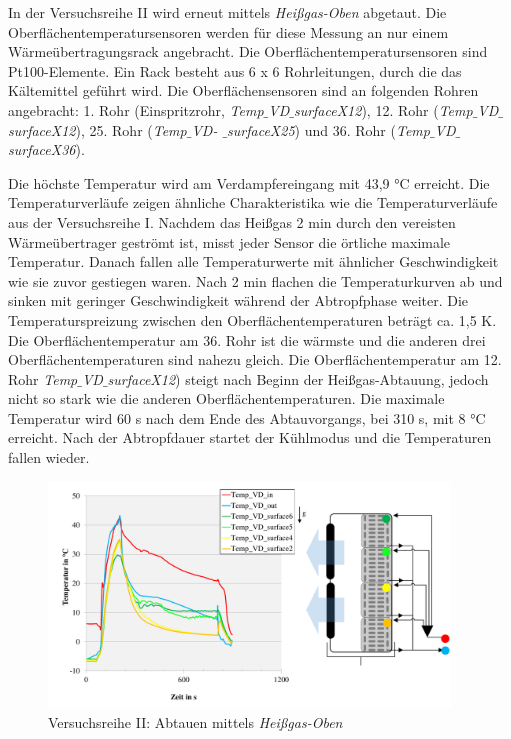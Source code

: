 In der Versuchsreihe II wird erneut mittels \textit{Heißgas-Oben} abgetaut. Die Oberflächentemperatursensoren werden für diese Messung an nur einem Wärmeübertragungsrack angebracht. Die Oberflächentemperatursensoren sind Pt100-Elemente. Ein Rack besteht aus 6 x 6 Rohrleitungen, durch die das Kältemittel geführt wird. Die Oberflächensensoren sind an folgenden Rohren angebracht: 1. Rohr (Einspritzrohr, \textit{Temp$\_$VD$\_$surfaceX12}), 12. Rohr (\textit{Temp$\_$VD$\_$surfaceX12}), 25. Rohr (\textit{Temp$\_$VD- $\_$surfaceX25}) und 36.  Rohr (\textit{Temp$\_$VD$\_$surfaceX36}).

Die höchste Temperatur wird am Verdampfereingang mit 43,9 °C erreicht. Die Temperaturverläufe zeigen ähnliche Charakteristika wie die Temperaturverläufe aus der Versuchsreihe I. Nachdem das Heißgas 2 min durch den vereisten Wärmeübertrager geströmt ist, misst jeder Sensor die örtliche maximale Temperatur.  Danach fallen alle Temperaturwerte mit ähnlicher Geschwindigkeit wie sie zuvor gestiegen waren. Nach 2 min flachen die Temperaturkurven ab und sinken mit geringer Geschwindigkeit während der Abtropfphase weiter. Die Temperaturspreizung zwischen den Oberflächentemperaturen beträgt ca. 1,5 K. Die Oberflächentemperatur am 36. Rohr ist die wärmste und die anderen drei Oberflächentemperaturen sind nahezu gleich. Die Oberflächentemperatur am 12. Rohr \textit{Temp$\_$VD$\_$surfaceX12}) steigt nach Beginn der Heißgas-Abtauung, jedoch nicht so stark wie die anderen Oberflächentemperaturen. Die maximale Temperatur wird 60 s nach dem Ende des Abtauvorgangs, bei 310 s, mit 8 °C erreicht. Nach der Abtropfdauer startet der Kühlmodus und die Temperaturen fallen wieder. 

\begin{figure}[htb]
\centering		\includegraphics[page=2,width=0.95\textwidth]{Pictures/Inbetriebnahme/Abtaumethoden_Tempverlaufe.pdf}
\caption{Versuchsreihe II: Abtauen mittels \textit{Heißgas-Oben}}
\label{fig:II_Heissgas_oben}
\end{figure}


